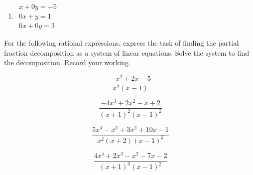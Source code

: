 \begin{exercise}
\begin{enumerate}
\item \(\begin{array}{l}x+0y=-5\\
0x+y=1\\
0x+0y=3
\end{array}\)

%
%
\end{enumerate}
\end{exercise}




\begin{exercise} \label{ex:} 
For the following rational expressions, express the task of finding the partial fraction decomposition as a system of linear equations.
Solve the system to find the decomposition.  
Record your working.
\begin{parts}
\item 
\begin{equation*}
\frac{-x^2+2x-5}{x^2(x-1)}
\end{equation*}

\item 
\begin{equation*}
\frac{-4x^3+2x^2-x+2}{(x+1)^2(x-1)^2}
\end{equation*}

\item 
\begin{equation*}
\frac{5x^4-x^3+3x^2+10x-1}{x^2(x+2)(x-1)^2}
\end{equation*}


\item 
\begin{equation*}
\frac{4x^4+2x^3-x^2-7x-2}{(x+1)^3(x-1)^2}
\end{equation*}

\end{parts}
\end{exercise}





